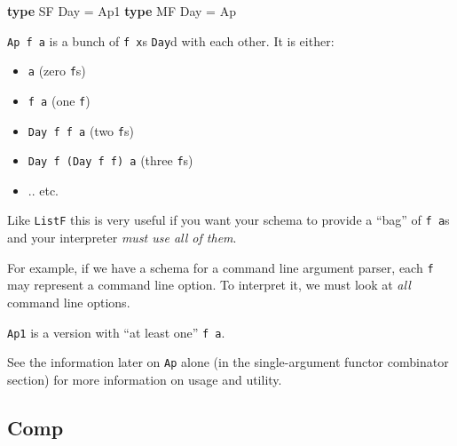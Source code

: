 \documentclass[]{article}
\newenvironment{Shaded}{}{}
\newcommand{\DataTypeTok}[1]{\textcolor[rgb]{0.56,0.13,0.00}{#1}}
\newcommand{\KeywordTok}[1]{\textcolor[rgb]{0.00,0.44,0.13}{\textbf{#1}}}
\newcommand{\OtherTok}[1]{\textcolor[rgb]{0.00,0.44,0.13}{#1}}
\begin{document}
\begin{itemize}
\begin{Shaded}
\begin{Highlighting}[]
\KeywordTok{type} \DataTypeTok{SF} \DataTypeTok{Day} \OtherTok{=} \DataTypeTok{Ap1}
\KeywordTok{type} \DataTypeTok{MF} \DataTypeTok{Day} \OtherTok{=} \DataTypeTok{Ap}
\end{Highlighting}
\end{Shaded}

  \texttt{Ap\ f\ a} is a bunch of \texttt{f\ x}s \texttt{Day}d with each other.
  It is either:

  \begin{itemize}
  \tightlist
  \item
    \texttt{a} (zero \texttt{f}s)
  \item
    \texttt{f\ a} (one \texttt{f})
  \item
    \texttt{Day\ f\ f\ a} (two \texttt{f}s)
  \item
    \texttt{Day\ f\ (Day\ f\ f)\ a} (three \texttt{f}s)
  \item
    .. etc.
  \end{itemize}

  Like \texttt{ListF} this is very useful if you want your schema to provide a
  ``bag'' of \texttt{f\ a}s and your interpreter \emph{must use all of them}.

  For example, if we have a schema for a command line argument parser, each
  \texttt{f} may represent a command line option. To interpret it, we must look
  at \emph{all} command line options.

  \texttt{Ap1} is a version with ``at least one'' \texttt{f\ a}.

  See the information later on \texttt{Ap} alone (in the single-argument functor
  combinator section) for more information on usage and utility.
\end{itemize}

\hypertarget{comp}{%
\subsection{Comp}\label{comp}}
\end{document}
